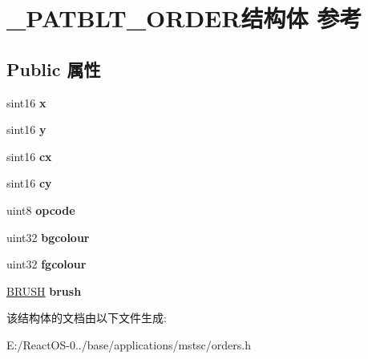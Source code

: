 \hypertarget{struct___p_a_t_b_l_t___o_r_d_e_r}{}\section{\+\_\+\+P\+A\+T\+B\+L\+T\+\_\+\+O\+R\+D\+E\+R结构体 参考}
\label{struct___p_a_t_b_l_t___o_r_d_e_r}
\subsection*{Public 属性}
\begin{DoxyCompactItemize}
\item 
\mbox{\label{struct___p_a_t_b_l_t___o_r_d_e_r_abe02fe1a43c4bba37164eba909aa83c1}} 
sint16 {\bfseries x}
\item 
\mbox{\label{struct___p_a_t_b_l_t___o_r_d_e_r_a5a3e6100539b032a2dfafb9f4233bfff}} 
sint16 {\bfseries y}
\item 
\mbox{\label{struct___p_a_t_b_l_t___o_r_d_e_r_ae2f50c9c8a5fabb5513f24b25d024c45}} 
sint16 {\bfseries cx}
\item 
\mbox{\label{struct___p_a_t_b_l_t___o_r_d_e_r_aaa17deb3b0f706f834fdb0aca3854fd7}} 
sint16 {\bfseries cy}
\item 
\mbox{\label{struct___p_a_t_b_l_t___o_r_d_e_r_ad7900d9b99dd8705d94b4cefae400284}} 
uint8 {\bfseries opcode}
\item 
\mbox{\label{struct___p_a_t_b_l_t___o_r_d_e_r_abaf617a962c26fce3b8d862be538bb50}} 
uint32 {\bfseries bgcolour}
\item 
\mbox{\label{struct___p_a_t_b_l_t___o_r_d_e_r_a808cd69839fd212bb05316ccf2618836}} 
uint32 {\bfseries fgcolour}
\item 
\mbox{\label{struct___p_a_t_b_l_t___o_r_d_e_r_a417ca0fd0289d8276b53c9a0467d47f4}} 
\hyperlink{class_b_r_u_s_h}{B\+R\+U\+SH} {\bfseries brush}
\end{DoxyCompactItemize}


该结构体的文档由以下文件生成\+:\begin{DoxyCompactItemize}
\item 
E\+:/\+React\+O\+S-\/0../base/applications/mstsc/orders.\+h\end{DoxyCompactItemize}
